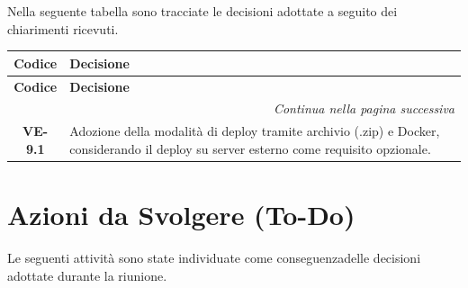 Nella seguente tabella sono tracciate le decisioni adottate a seguito
dei chiarimenti ricevuti.


\renewcommand{\arraystretch}{1.3}

\vspace{-0.3cm}

\noindent

\begin{longtable}{c p{12cm}}

\toprule

\textbf{Codice} & \textbf{Decisione} \\

\midrule

\endfirsthead


\toprule

\textbf{Codice} & \textbf{Decisione} \\

\midrule

\endhead


\midrule

\multicolumn{2}{r}{\textit{Continua nella pagina successiva}} \\

\midrule

\endfoot


\bottomrule

\endlastfoot


\textbf{VE-9.1}

& Adozione della modalità di deploy tramite archivio (.zip) e Docker, considerando il deploy su server esterno come requisito opzionale. \\[4pt]

\end{longtable}


\section{Azioni da Svolgere (To-Do)}


Le seguenti attività sono state individuate come conseguenzadelle decisioni adottate durante la riunione.


\renewcommand{\arraystretch}{1.3}

